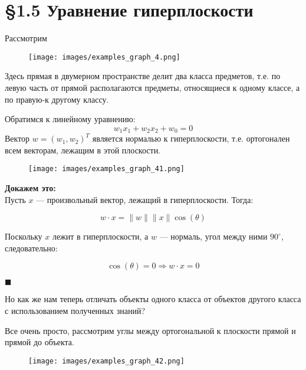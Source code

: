 \newpage
\centering
\section*{\S 1.5 Уравнение гиперплоскости}
\vspace{0.8cm}
\raggedright
Рассмотрим
\begin{figure}[htbp]
        \centering
        \texttt{[image: images/examples\_graph\_4.png]}
        \label{fig:example_4}
\end{figure}
Здесь прямая в двумерном пространстве делит два класса предметов, т.е. по левую часть от прямой располагаются предметы,
относящиеся к одному классе, а по правую-к другому классу. \\
\vspace{0.5cm}

Обратимся к линейному уравнению:
\[
    w_1 x_1 + w_2 x_2 + w_0 = 0
\]
Вектор \(w = (w_1, w_2)^T\) является нормалью к гиперплоскости, т.е. ортогонален всем векторам, лежащим в этой плоскости.


\begin{figure}[htbp]
        \centering
        \texttt{[image: images/examples\_graph\_41.png]}
        \label{fig:example_41}
\end{figure}
\vspace{0.5cm}

\textbf{Докажем это:} \\

Пусть \(x\) — произвольный вектор, лежащий в гиперплоскости. Тогда:

\[
w \cdot x = \|w\| \|x\| \cos(\theta)
\]

Поскольку \(x\) лежит в гиперплоскости, а \(w\) — нормаль, угол между ними \(90^\circ\), следовательно:

\[
\cos(\theta) = 0 \Rightarrow w \cdot x = 0
\]

\(\blacksquare\)

\vspace{0,5cm}
Но как же  нам теперь отличать объекты одного класса от объектов другого класса с использованием полученных знаний?

Все очень просто, рассмотрим углы между ортогональной к плоскости прямой и прямой до объекта.
\begin{figure}[htbp]
        \centering
        \texttt{[image: images/examples\_graph\_42.png]}
        \label{fig:example_42}
\end{figure} \\

